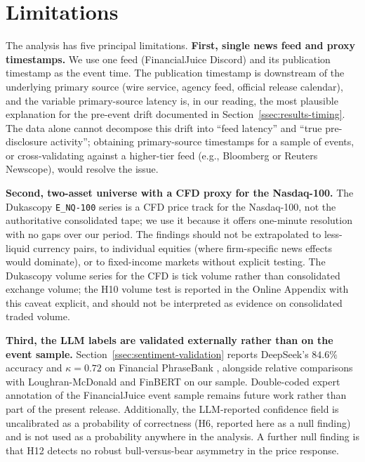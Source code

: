 \section{Limitations}
\label{sec:limitations}

The analysis has five principal limitations. \textbf{First, single
news feed and proxy timestamps.} We use one feed (FinancialJuice
Discord) and its publication timestamp as the event time. The
publication timestamp is downstream of the underlying primary source
(wire service, agency feed, official release calendar), and the
variable primary-source latency is, in our reading, the most
plausible explanation for the pre-event drift documented in
Section~\ref{ssec:results-timing}. The data alone cannot decompose
this drift into ``feed latency'' and ``true pre-disclosure
activity''; obtaining primary-source timestamps for a sample of
events, or cross-validating against a higher-tier feed (e.g.,
Bloomberg or Reuters Newscope), would resolve the issue.

\textbf{Second, two-asset universe with a CFD proxy for the
Nasdaq-100.} The Dukascopy \texttt{E\_NQ-100} series is a CFD price
track for the Nasdaq-100, not the authoritative consolidated tape;
we use it because it offers one-minute resolution with no gaps over
our period. The findings should not be extrapolated to less-liquid
currency pairs, to individual equities (where firm-specific news
effects would dominate), or to fixed-income markets without explicit
testing. The Dukascopy volume series for the CFD is tick volume
rather than consolidated exchange volume; the H10 volume test is
reported in the Online Appendix with this caveat explicit, and
should not be interpreted as evidence on consolidated traded volume.

\textbf{Third, the LLM labels are validated externally rather than on
the event sample.} Section~\ref{ssec:sentiment-validation} reports
DeepSeek's $84.6\%$ accuracy and $\kappa = 0.72$ on Financial
PhraseBank \citep{malo2014good}, alongside relative comparisons with
Loughran-McDonald and FinBERT on our sample. Double-coded expert
annotation of the FinancialJuice event sample remains future work
rather than part of the present release. Additionally, the
LLM-reported confidence
field is uncalibrated as a probability of correctness (H6, reported
here as a null finding) and is not used as a probability anywhere
in the analysis. A further null finding is that H12 detects no
robust bull-versus-bear asymmetry in the price response.

